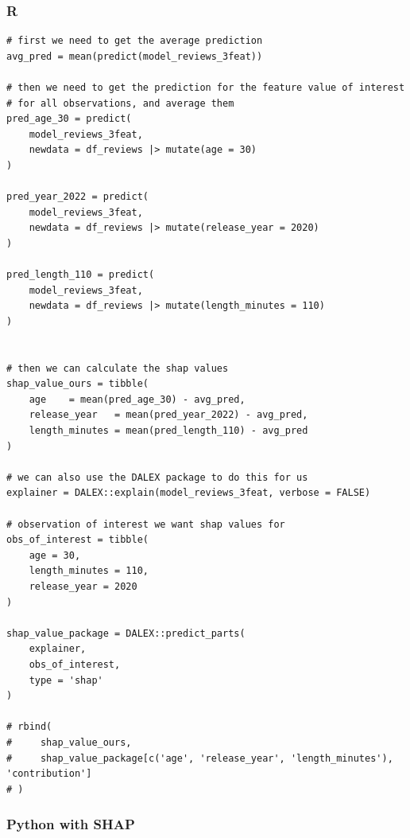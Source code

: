\documentclass[
  letterpaper,
]{krantz}
\begin{document}
\subsubsection{R}

\begin{verbatim}
# first we need to get the average prediction
avg_pred = mean(predict(model_reviews_3feat))

# then we need to get the prediction for the feature value of interest
# for all observations, and average them
pred_age_30 = predict(
    model_reviews_3feat,
    newdata = df_reviews |> mutate(age = 30) 
)

pred_year_2022 = predict(
    model_reviews_3feat,
    newdata = df_reviews |> mutate(release_year = 2020) 
)

pred_length_110 = predict(
    model_reviews_3feat,
    newdata = df_reviews |> mutate(length_minutes = 110) 
)


# then we can calculate the shap values
shap_value_ours = tibble(
    age    = mean(pred_age_30) - avg_pred,
    release_year   = mean(pred_year_2022) - avg_pred,
    length_minutes = mean(pred_length_110) - avg_pred
)

# we can also use the DALEX package to do this for us
explainer = DALEX::explain(model_reviews_3feat, verbose = FALSE)

# observation of interest we want shap values for
obs_of_interest = tibble(
    age = 30,
    length_minutes = 110,
    release_year = 2020
)

shap_value_package = DALEX::predict_parts(
    explainer,
    obs_of_interest,
    type = 'shap'
)

# rbind(
#     shap_value_ours,
#     shap_value_package[c('age', 'release_year', 'length_minutes'), 'contribution']
# )
\end{verbatim}

\subsubsection{Python with SHAP}
\end{document}
